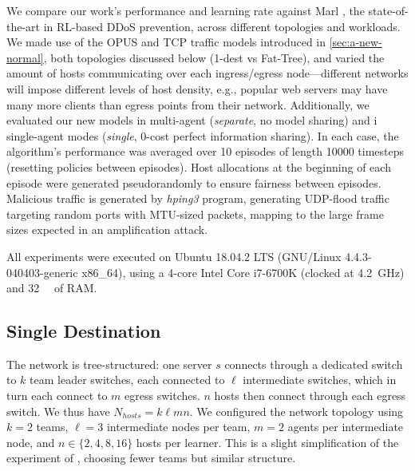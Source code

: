 \documentclass[10pt, times, conference, letterpaper]{IEEEtran}
\begin{document}

We compare our work's performance and learning rate against Marl \cite{DBLP:journals/eaai/MalialisK15}, the state-of-the-art in RL-based DDoS prevention, across different topologies and workloads.
We made use of the OPUS and TCP traffic models introduced in \cref{sec:a-new-normal}, both topologies discussed below (1-dest vs Fat-Tree), and varied the amount of hosts communicating over each ingress/egress node---different networks will impose different levels of host density, e.g., popular web servers may have many more clients than egress points from their network.
Additionally, we evaluated our new models in multi-agent (\emph{separate}, no model sharing) and i single-agent modes (\emph{single}, 0-cost perfect information sharing).
In each case, the algorithm's performance was averaged over \num{10} episodes of length \num{10000} timesteps (resetting policies between episodes).
Host allocations at the beginning of each episode were generated pseudorandomly to ensure fairness between episodes.
Malicious traffic is generated by \emph{hping3} program, generating UDP-flood traffic targeting random ports with MTU-sized packets, mapping to the large frame sizes expected in an amplification attack.

All experiments were executed on Ubuntu 18.04.2 LTS (GNU/Linux 4.4.3-040403-generic x86\_64), using a 4-core Intel Core i7-6700K (clocked at \SI{4.2}{\giga\hertz}) and \SI{32}{\gibi\byte} of RAM.

\subsection{Single Destination}\label{sec:single-dest}
The network is tree-structured: one server $s$ connects through a dedicated switch to $k$ team leader switches, each connected to $\ell$ intermediate switches, which in turn each connect to $m$ egress switches.
$n$ hosts then connect through each egress switch.
We thus have $N_{\mathit{hosts}} = k \ell m n$.
We configured the network topology using $k=2$ teams, $\ell=3$ intermediate nodes per team, $m=2$ agents per intermediate node, and $n \in \{2, 4, 8, 16\}$ hosts per learner.
This is a slight simplification of the  experiment of \textcite{DBLP:journals/eaai/MalialisK15}, choosing fewer teams but similar structure.
\end{document}
